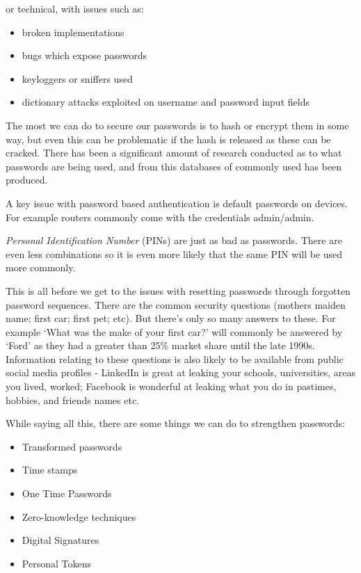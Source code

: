 or technical, with issues such as:
\begin{itemize}
    \item broken implementations
    \item bugs which expose passwords
    \item keyloggers or sniffers used
    \item dictionary attacks exploited on username and password input fields
\end{itemize}

The most we can do to secure our passwords is to hash or encrypt them in some way, but even this can be problematic if the hash is released as these can be cracked. There has been a significant amount of research conducted as to what passwords are being used, and from this databases of commonly used has been produced.

A key issue with password based authentication is default passwords on devices. For example routers commonly come with the credentials admin/admin. 

\textit{Personal Identification Number} (PINs) are just as bad as passwords. There are even less combinations so it is even more likely that the same PIN will be used more commonly. 

This is all before we get to the issues with resetting passwords through forgotten password sequences. There are the common security questions (mothers maiden name; first car; first pet; etc). But there's only so many answers to these. For example `What was the make of your first car?' will commonly be answered by `Ford' as they had a greater than 25\% market share until the late 1990s. Information relating to these questions is also likely to be available from public social media profiles - LinkedIn is great at leaking your schools, universities, areas you lived, worked; Facebook is wonderful at leaking what you do in pastimes, hobbies, and friends names etc.

While saying all this, there are some things we can do to strengthen passwords:
\begin{itemize}
    \item Transformed passwords
    \item Time stamps
    \item One Time Passwords
    \item Zero-knowledge techniques
    \item Digital Signatures
    \item Personal Tokens
\end{itemize}


